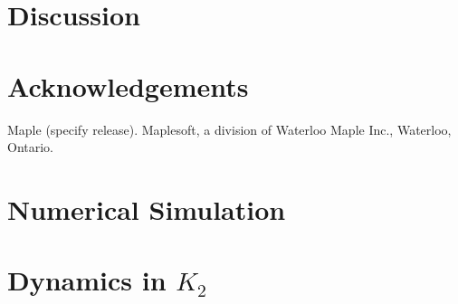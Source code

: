 \documentclass{article}
\begin{document}
\section{Discussion}

\section{Acknowledgements}
Maple (specify release). Maplesoft, a division of Waterloo Maple Inc., Waterloo, Ontario.
\newpage


\nocite{strogatz2007nonlinear}

\newpage
\appendix
%
%
%
\section{Numerical Simulation}\label{app:NumSim}

\section{Dynamics in \texorpdfstring{$K_2$}{K2}}
\end{document}
